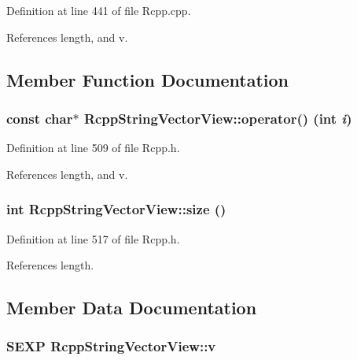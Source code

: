 Definition at line 441 of file Rcpp.cpp.

References length, and v.

\subsection{Member Function Documentation}
\hypertarget{classRcppStringVectorView_b81899b7d6c595f84d2fb07809ff002c}{
\subsubsection[operator()]{\setlength{\rightskip}{0pt plus 5cm}const char$\ast$ RcppStringVectorView::operator() (int {\em i})}}
\label{classRcppStringVectorView_b81899b7d6c595f84d2fb07809ff002c}




Definition at line 509 of file Rcpp.h.

References length, and v.\hypertarget{classRcppStringVectorView_df0f6b6541339ca747c4ed79c445869e}{
\subsubsection[size]{\setlength{\rightskip}{0pt plus 5cm}int RcppStringVectorView::size ()}}
\label{classRcppStringVectorView_df0f6b6541339ca747c4ed79c445869e}




Definition at line 517 of file Rcpp.h.

References length.

\subsection{Member Data Documentation}
\hypertarget{classRcppStringVectorView_1db3cc1a2dd1809151351c123343c15e}{
\subsubsection[v]{\setlength{\rightskip}{0pt plus 5cm}SEXP {\bf RcppStringVectorView::v}}}
\label{classRcppStringVectorView_1db3cc1a2dd1809151351c123343c15e}




